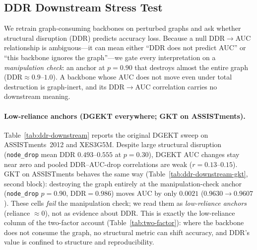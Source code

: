 \documentclass[pdflatex,sn-mathphys-num]{sn-jnl}
\newcommand{\DDR}{\textsc{DDR}}
\begin{document}
\subsection{\DDR{} Downstream Stress Test}
\label{sec:exp-ddr-downstream}


We retrain graph-consuming backbones on perturbed graphs and ask whether
structural disruption (\DDR{}) predicts accuracy loss. Because a null
\DDR{}$\to$AUC relationship is ambiguous---it can mean either ``\DDR{} does not
predict AUC'' or ``this backbone ignores the graph''---we gate every
interpretation on a \emph{manipulation check}: an anchor at $p{=}0.90$ that
destroys almost the entire graph (\DDR{}${\approx}0.9$--$1.0$). A backbone whose
AUC does not move even under total destruction is graph-inert, and its
\DDR{}$\to$AUC correlation carries no downstream meaning.

\paragraph{Low-reliance anchors (DGEKT everywhere; GKT on ASSISTments).}
Table~\ref{tab:ddr-downstream} reports the original DGEKT sweep on
ASSISTments~2012 and XES3G5M. Despite large structural disruption
(\texttt{node\_drop} mean \DDR{} $0.493$--$0.555$ at $p{=}0.30$), DGEKT AUC
changes stay near zero and pooled \DDR{}--AUC-drop correlations are weak
($r{=}0.13$--$0.15$). GKT on ASSISTments behaves the same way
(Table~\ref{tab:ddr-downstream-gkt}, second block): destroying the graph
entirely at the manipulation-check anchor (\texttt{node\_drop} $p{=}0.90$,
\DDR{}${=}0.986$) moves AUC by only $0.0021$ ($0.9630{\to}0.9607$). These cells
\emph{fail} the manipulation check; we read them as \emph{low-reliance anchors}
(reliance ${\approx}0$), not as evidence about \DDR{}. This is exactly the
low-reliance column of the two-factor account (Table~\ref{tab:two-factor}):
where the backbone does not consume the graph, no structural metric can shift
accuracy, and \DDR{}'s value is confined to structure and reproducibility.
\end{document}
